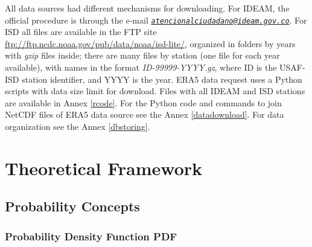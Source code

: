 \documentclass[12pt,oneside]{reedthesis}
\begin{document}
All data sources had different mechanisms for downloading. For IDEAM, the official procedure is through the e-mail \emph{\href{mailto:atencionalciudadano@ideam.gov.co}{\nolinkurl{atencionalciudadano@ideam.gov.co}}}. For ISD all files are available in the FTP site \url{ftp://ftp.ncdc.noaa.gov/pub/data/noaa/isd-lite/}, organized in folders by years with \emph{gzip} files inside; there are many files by station (one file for each year available), with names in the format \emph{ID-99999-YYYY.gz}, where ID is the USAF-ISD station identifier, and YYYY is the year. ERA5 data request uses a Python scripts with data size limit for download. Files with all IDEAM and ISD stations are available in Annex \ref{rcode}. For the Python code and commands to join NetCDF files of ERA5 data source see the Annex \ref{datadownload}. For data organization see the Annex \ref{dbstoring}.

\clearpage

\hypertarget{rmd-thefra}{%
\chapter{Theoretical Framework}\label{rmd-thefra}}

\hypertarget{probability-concepts}{%
\section{Probability Concepts}\label{probability-concepts}}

\hypertarget{probability-density-function-pdf}{%
\subsection{Probability Density Function PDF}\label{probability-density-function-pdf}}
\end{document}
